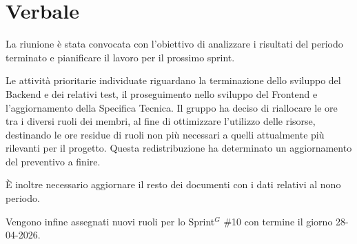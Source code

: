 \documentclass[a4paper,10pt]{article}
\begin{document}
\section*{Verbale}

La riunione è stata convocata con l’obiettivo di analizzare i risultati del periodo terminato e pianificare il lavoro per il prossimo sprint.

Le attività prioritarie individuate riguardano la terminazione dello sviluppo del Backend e dei relativi test, il proseguimento nello sviluppo del Frontend e l'aggiornamento della Specifica Tecnica. Il gruppo ha deciso di riallocare le ore tra i diversi ruoli dei membri, al fine di ottimizzare l’utilizzo delle risorse, destinando le ore residue di ruoli non più necessari a quelli attualmente più rilevanti per il progetto. Questa redistribuzione ha determinato un aggiornamento del preventivo a finire.

È inoltre necessario aggiornare il resto dei documenti con i dati relativi al nono periodo.

Vengono infine assegnati nuovi ruoli per lo Sprint$^G$ \#10 con termine il giorno 28-04-2026.
\end{document}

